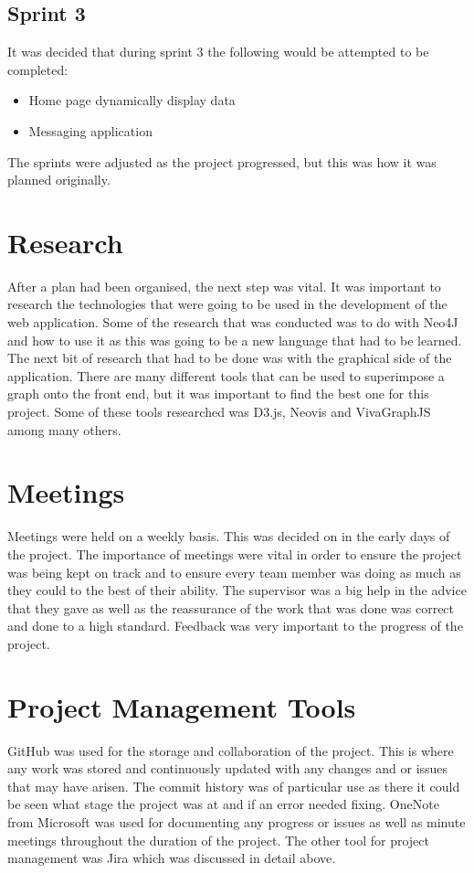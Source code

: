 \subsection{Sprint 3}
It was decided that during sprint 3 the following would be attempted to be completed:
\begin{itemize}
\item Home page dynamically display data
\item Messaging application
\end{itemize}
The sprints were adjusted as the project progressed, but this was how it was planned originally. 

\section{Research}
After a plan had been organised, the next step was vital. It was important to research the technologies that were going to be used in the development of the web application. Some of the research that was conducted was to do with Neo4J and how to use it as this was going to be a new language that had to be learned. The next bit of research that had to be done was with the graphical side of the application. There are many different tools that can be used to superimpose a graph onto the front end, but it was important to find the best one for this project. Some of these tools researched was D3.js, Neovis and VivaGraphJS among many others. 

\section{Meetings}
Meetings were held on a weekly basis. This was decided on in the early days of the project. The importance of meetings were vital in order to ensure the project was being kept on track and to ensure every team member was doing as much as they could to the best of their ability. The supervisor was a big help in the advice that they gave as well as the reassurance of the work that was done was correct and done to a high standard. Feedback was very important to the progress of the project. 

\section{Project Management Tools }
GitHub was used for the storage and collaboration of the project. This is where any work was stored and continuously updated with any changes and or issues that may have arisen. The commit history was of particular use as there it could be seen what stage the project was at and if an error needed fixing. OneNote from Microsoft was used for documenting any progress or issues as well as minute meetings throughout the duration of the project. The other tool for project management was Jira which was discussed in detail above. 

